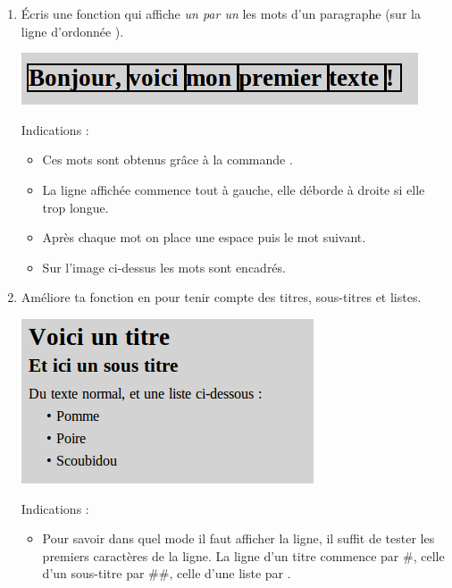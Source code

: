 \documentclass[11pt,class=report,crop=false]{standalone}
\begin{document}
\begin{activite}


\begin{enumerate}
  \item Écris une fonction  qui affiche \emph{un par un} les mots d'un paragraphe  (sur la ligne d'ordonnée ). 
  
\begin{center}
\includegraphics[scale=0.6]{ecran-markdown-3}
\end{center}   

  Indications :
  \begin{itemize}
    \item Ces mots sont obtenus grâce à la commande .
    \item La ligne affichée commence tout à gauche, elle déborde à droite si elle trop longue.
    \item Après chaque mot on place une espace puis le mot suivant.
    \item Sur l'image ci-dessus les mots sont encadrés.
   \end{itemize}
   
 
  \item Améliore ta fonction en  pour tenir compte des titres, sous-titres et listes.
  
   
\begin{center}
\includegraphics[scale=0.7]{ecran-markdown-4}
\end{center}    
  
  Indications :
  \begin{itemize}
    \item Pour savoir dans quel mode il faut afficher la ligne, il suffit de tester les premiers caractères de la ligne. La ligne d'un titre commence par \#, celle d'un sous-titre par \#\#, celle d'une liste par \ci{+}. 
    

\end{itemize}
\end{enumerate}
\end{activite}
\end{document}
